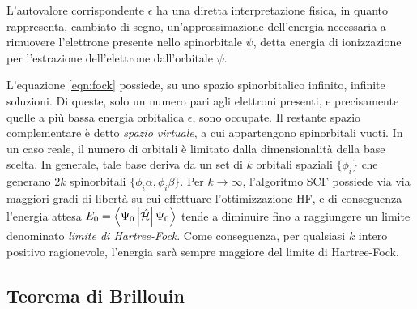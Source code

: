 L'autovalore corrispondente $\epsilon$ ha una diretta interpretazione fisica,
in quanto rappresenta, cambiato di segno, un'approssimazione dell'energia
necessaria a rimuovere l'elettrone presente nello spinorbitale $\psi$,
detta energia di ionizzazione per l'estrazione dell'elettrone dall'orbitale $\psi$.

L'equazione \ref{eqn:fock} possiede, su uno spazio spinorbitalico infinito,
infinite soluzioni. Di queste, solo un numero pari agli elettroni
presenti, e precisamente quelle a pi\`u bassa energia orbitalica $\epsilon$,
sono occupate. Il restante spazio complementare \`e detto \textit{spazio
virtuale}, a cui appartengono spinorbitali vuoti.
In un caso reale, il numero di orbitali \`e limitato dalla
dimensionalit\`a della base scelta. In generale, tale base deriva da un set
di $k$ orbitali spaziali $\{ \phi_i \}$ che generano $ 2k $ spinorbitali $\{
\phi_i \alpha , \phi_i \beta \}$. Per $ k \rightarrow \infty $, l'algoritmo
SCF possiede via via maggiori gradi di libert\`a su cui effettuare
l'ottimizzazione HF, e di conseguenza l'energia attesa $ E_0 =
\left\langle \Psi_0 \left| \hat{\mathcal{H}} \right| \Psi_0 \right\rangle $ tende a diminuire fino a raggiungere un limite
denominato \textit{limite di Hartree-Fock}.
Come conseguenza, per qualsiasi $k$ intero positivo ragionevole, l'energia
sar\`a sempre maggiore del limite di Hartree-Fock.

\subsection{Teorema di Brillouin}

